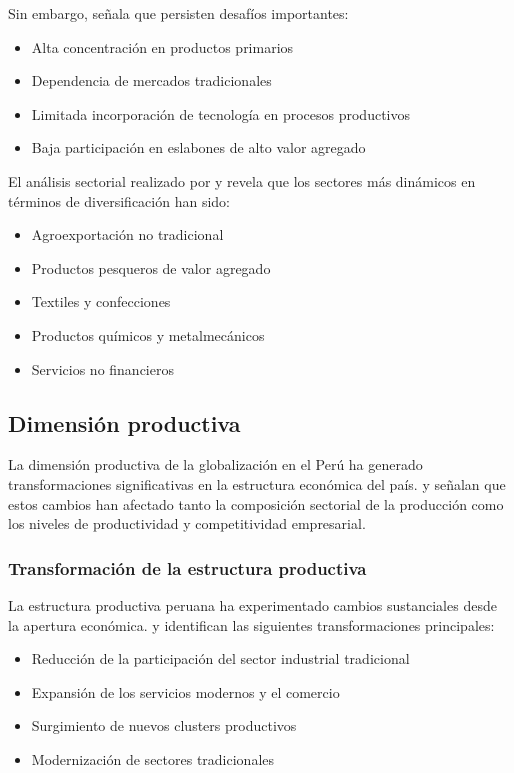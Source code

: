 \documentclass[12pt, a4paper]{article}
\begin{document}
Sin embargo, \textcite{fairlie2020} señala que persisten desafíos importantes:
\begin{itemize}
    \item Alta concentración en productos primarios
    \item Dependencia de mercados tradicionales
    \item Limitada incorporación de tecnología en procesos productivos
    \item Baja participación en eslabones de alto valor agregado
\end{itemize}

El análisis sectorial realizado por \textcite{lopez2019} y \textcite{sanchez2020} revela que los sectores más dinámicos en términos de diversificación han sido:
\begin{itemize}
    \item Agroexportación no tradicional
    \item Productos pesqueros de valor agregado
    \item Textiles y confecciones
    \item Productos químicos y metalmecánicos
    \item Servicios no financieros
\end{itemize}

\subsection{Dimensión productiva}

La dimensión productiva de la globalización en el Perú ha generado transformaciones significativas en la estructura económica del país. \textcite{tavara2020} y \textcite{cespedes2019} señalan que estos cambios han afectado tanto la composición sectorial de la producción como los niveles de productividad y competitividad empresarial.

\subsubsection{Transformación de la estructura productiva}
La estructura productiva peruana ha experimentado cambios sustanciales desde la apertura económica. \textcite{jimenez2021} y \textcite{vera2018} identifican las siguientes transformaciones principales:

\begin{itemize}
    \item Reducción de la participación del sector industrial tradicional
    \item Expansión de los servicios modernos y el comercio
    \item Surgimiento de nuevos clusters productivos
    \item Modernización de sectores tradicionales
\end{itemize}
\end{document}
